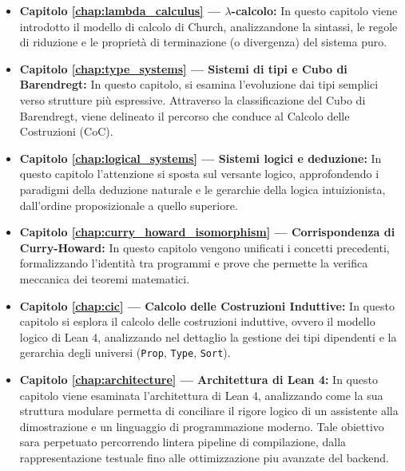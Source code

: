 \begin{itemize}
    \item \textbf{Capitolo \ref{chap:lambda_calculus} --- \texorpdfstring{$\lambda$}{Lambda}-calcolo:}
        In questo capitolo viene introdotto il modello di calcolo di Church, analizzandone la sintassi, le regole di riduzione e le 
        proprietà di terminazione (o divergenza) del sistema puro.

    \item \textbf{Capitolo \ref{chap:type_systems} --- Sistemi di tipi e Cubo di Barendregt:} 
        In questo capitolo, si esamina l'evoluzione dai tipi semplici verso strutture più espressive. Attraverso la classificazione 
        del Cubo di Barendregt, viene delineato il percorso che conduce al Calcolo delle Costruzioni (CoC).
        
    \item \textbf{Capitolo \ref{chap:logical_systems} --- Sistemi logici e deduzione:} 
        In questo capitolo l'attenzione si sposta sul versante logico, approfondendo i paradigmi della deduzione naturale e le gerarchie 
        della logica intuizionista, dall'ordine proposizionale a quello superiore.
    
    \item \textbf{Capitolo \ref{chap:curry_howard_isomorphism} --- Corrispondenza di Curry-Howard:} 
        In questo capitolo vengono unificati i concetti precedenti, formalizzando l'identità tra programmi e prove che permette la 
        verifica meccanica dei teoremi matematici.
    
    \item \textbf{Capitolo \ref{chap:cic} --- Calcolo delle Costruzioni Induttive:} 
        In questo capitolo si esplora il calcolo delle costruzioni induttive, ovvero il modello logico di Lean 4, analizzando nel 
        dettaglio la gestione dei tipi dipendenti e la gerarchia degli universi (\texttt{Prop}, \texttt{Type}, \texttt{Sort}).
    
    \item \textbf{Capitolo \ref{chap:architecture} --- Architettura di Lean 4:} 
        In questo capitolo viene esaminata l'architettura di Lean 4, analizzando come la sua struttura modulare permetta di conciliare il rigore logico di un 
        assistente alla dimostrazione e un linguaggio di programmazione moderno. Tale obiettivo sara perpetuato percorrendo lintera pipeline di compilazione,
        dalla rappresentazione testuale fino alle ottimizzazione piu avanzate del backend.
    

\end{itemize}
